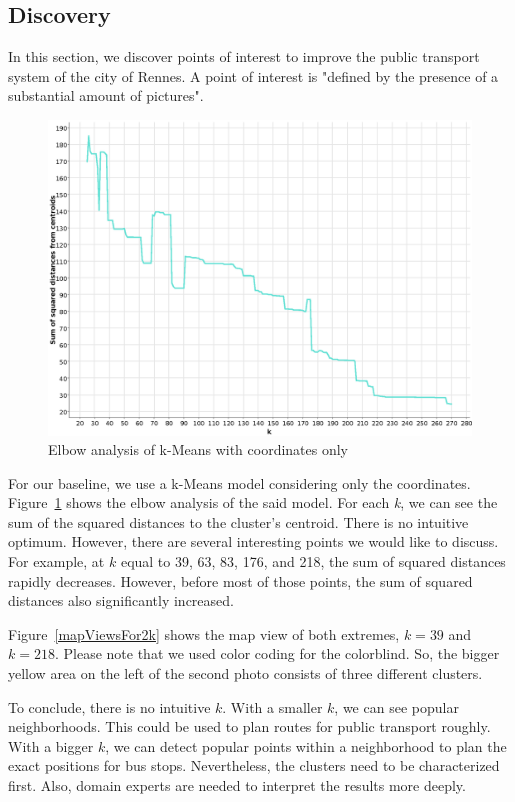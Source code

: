 \documentclass[runningheads]{llncs}
\begin{document}
\subsection{Discovery}\label{clustering}
In this section, we discover points of interest to improve the public transport system of the city of Rennes. A point of interest is "defined by the presence of a substantial amount of pictures".

\begin{figure}
\includegraphics[width=\textwidth]{elbowAnalysis_4195_coordinates.eps}
\caption{Elbow analysis of k-Means with coordinates only} \label{elbow_coordinates}
\end{figure}

For our baseline, we use a k-Means model considering only the coordinates. Figure~\ref{elbow_coordinates} shows the elbow analysis of the said model. For each {\itshape k}, we can see the sum of the squared distances to the cluster's centroid. There is no intuitive optimum. However, there are several interesting points we would like to discuss. For example, at $k$ equal to 39, 63, 83, 176, and 218, the sum of squared distances rapidly decreases. However, before most of those points, the sum of squared distances also significantly increased.

Figure~\ref{mapViewsFor2k} shows the map view of both extremes, $k=39$ and $k=218$. Please note that we used color coding for the colorblind. So, the bigger yellow area on the left of the second photo consists of three different clusters.

To conclude, there is no intuitive $k$. With a smaller $k$, we can see popular neighborhoods. This could be used to plan routes for public transport roughly. With a bigger $k$, we can detect popular points within a neighborhood to plan the exact positions for bus stops. Nevertheless, the clusters need to be characterized first. Also, domain experts are needed to interpret the results more deeply.
\end{document}
